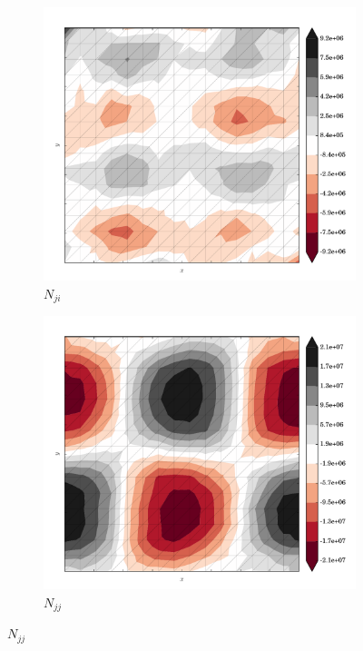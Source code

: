 \begin{figure}
  \begin{subfigure}[b]{0.3\linewidth}
    \includegraphics[width=\linewidth]{images/stress_balance/FS/N_ji.pdf}
  \caption{$N_{ji}$}
  \label{fs_N_ji}
  \end{subfigure}
  \begin{subfigure}[b]{0.3\linewidth}
    \includegraphics[width=\linewidth]{images/stress_balance/FS/N_jj.pdf}
  \caption{$N_{jj}$}
  \label{fs_N_jj}
  \end{subfigure}

\end{figure}
